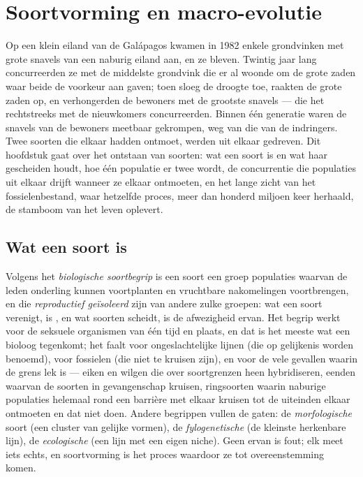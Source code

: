 \chapter{Soortvorming en macro-evolutie}\label{ch:b2:speciation}

Op een klein eiland van de Galápagos kwamen in 1982 enkele grondvinken met
grote snavels van een naburig eiland aan, en ze bleven. Twintig jaar lang
concurreerden ze met de middelste grondvink die er al woonde om de grote zaden
waar beide de voorkeur aan gaven; toen sloeg de droogte toe, raakten de grote
zaden op, en verhongerden de bewoners met de grootste snavels --- die het
rechtstreeks met de nieuwkomers concurreerden. Binnen één generatie waren de
snavels van de bewoners meetbaar gekrompen, weg van die van de indringers.
Twee soorten die elkaar hadden ontmoet, werden uit elkaar gedreven. Dit
hoofdstuk gaat over het ontstaan van soorten: wat een soort is en wat haar
gescheiden houdt, hoe één populatie er twee wordt, de concurrentie die
populaties uit elkaar drijft wanneer ze elkaar ontmoeten, en het lange zicht
van het fossielenbestand, waar hetzelfde proces, meer dan honderd miljoen keer
herhaald, de stamboom van het leven oplevert.

\section{Wat een soort is}

\begin{definition}[Soort]\label{def:b2:speciation:species}
Volgens het \emph{biologische soortbegrip} is een soort een groep populaties
waarvan de leden onderling kunnen voortplanten en vruchtbare nakomelingen
voortbrengen, en die \emph{reproductief geïsoleerd} zijn van andere zulke
groepen: wat een soort verenigt, is , en wat soorten scheidt, is de
afwezigheid ervan. Het begrip werkt voor de seksuele organismen van één tijd en
plaats, en dat is het meeste wat een bioloog tegenkomt; het faalt voor
ongeslachtelijke lijnen (die op gelijkenis worden benoemd), voor fossielen
(die niet te kruisen zijn), en voor de vele gevallen waarin de grens lek is ---
eiken en wilgen die over soortgrenzen heen hybridiseren, eenden waarvan de
soorten in gevangenschap kruisen, ringsoorten waarin naburige populaties
helemaal rond een barrière met elkaar kruisen tot de uiteinden elkaar
ontmoeten en dat niet doen. Andere begrippen vullen de gaten: de
\emph{morfologische} soort (een cluster van gelijke vormen), de
\emph{fylogenetische} (de kleinste herkenbare lijn), de \emph{ecologische}
(een lijn met een eigen niche). Geen ervan is fout; elk meet iets echts, en
soortvorming is het proces waardoor ze tot overeenstemming komen.
\end{definition}


